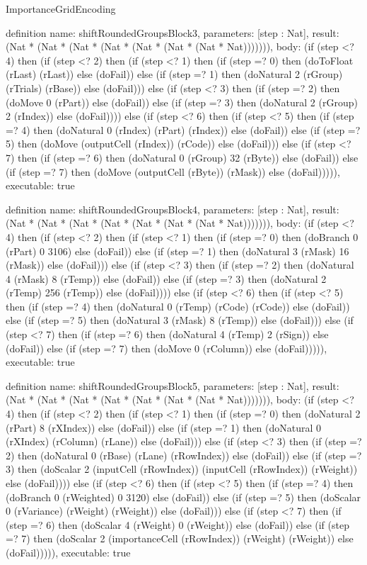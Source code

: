\begin{lexlean}{ImportanceGridEncoding}
\begin{semanticmodule}
definition{
  name: shiftRoundedGroupsBlock3,
  parameters: [step : Nat],
  result: (Nat * (Nat * (Nat * (Nat * (Nat * (Nat * (Nat * Nat))))))),
  body: (if (step <? 4) then
      (if (step <? 2) then
      (if (step <? 1) then
      (if (step =? 0) then (doToFloat (rLast) (rLast)) else (doFail)) else
      (if (step =? 1) then (doNatural 2 (rGroup) (rTrials) (rBase)) else (doFail))) else
      (if (step <? 3) then
      (if (step =? 2) then (doMove 0 (rPart)) else (doFail)) else
      (if (step =? 3) then (doNatural 2 (rGroup) 2 (rIndex)) else (doFail)))) else
      (if (step <? 6) then
      (if (step <? 5) then
      (if (step =? 4) then (doNatural 0 (rIndex) (rPart) (rIndex)) else (doFail)) else
      (if (step =? 5) then (doMove (outputCell (rIndex)) (rCode)) else (doFail))) else
      (if (step <? 7) then
      (if (step =? 6) then (doNatural 0 (rGroup) 32 (rByte)) else (doFail)) else
      (if (step =? 7) then (doMove (outputCell (rByte)) (rMask)) else (doFail))))),
  executable: true
}

definition{
  name: shiftRoundedGroupsBlock4,
  parameters: [step : Nat],
  result: (Nat * (Nat * (Nat * (Nat * (Nat * (Nat * (Nat * Nat))))))),
  body: (if (step <? 4) then
      (if (step <? 2) then
      (if (step <? 1) then
      (if (step =? 0) then (doBranch 0 (rPart) 0 3106) else (doFail)) else
      (if (step =? 1) then (doNatural 3 (rMask) 16 (rMask)) else (doFail))) else
      (if (step <? 3) then
      (if (step =? 2) then (doNatural 4 (rMask) 8 (rTemp)) else (doFail)) else
      (if (step =? 3) then (doNatural 2 (rTemp) 256 (rTemp)) else (doFail)))) else
      (if (step <? 6) then
      (if (step <? 5) then
      (if (step =? 4) then (doNatural 0 (rTemp) (rCode) (rCode)) else (doFail)) else
      (if (step =? 5) then (doNatural 3 (rMask) 8 (rTemp)) else (doFail))) else
      (if (step <? 7) then
      (if (step =? 6) then (doNatural 4 (rTemp) 2 (rSign)) else (doFail)) else
      (if (step =? 7) then (doMove 0 (rColumn)) else (doFail))))),
  executable: true
}

definition{
  name: shiftRoundedGroupsBlock5,
  parameters: [step : Nat],
  result: (Nat * (Nat * (Nat * (Nat * (Nat * (Nat * (Nat * Nat))))))),
  body: (if (step <? 4) then
      (if (step <? 2) then
      (if (step <? 1) then
      (if (step =? 0) then (doNatural 2 (rPart) 8 (rXIndex)) else (doFail)) else
      (if (step =? 1) then (doNatural 0 (rXIndex) (rColumn) (rLane)) else (doFail))) else
      (if (step <? 3) then
      (if (step =? 2) then (doNatural 0 (rBase) (rLane) (rRowIndex)) else (doFail)) else
      (if (step =? 3) then (doScalar 2 (inputCell (rRowIndex)) (inputCell (rRowIndex)) (rWeight)) else (doFail)))) else
      (if (step <? 6) then
      (if (step <? 5) then
      (if (step =? 4) then (doBranch 0 (rWeighted) 0 3120) else (doFail)) else
      (if (step =? 5) then (doScalar 0 (rVariance) (rWeight) (rWeight)) else (doFail))) else
      (if (step <? 7) then
      (if (step =? 6) then (doScalar 4 (rWeight) 0 (rWeight)) else (doFail)) else
      (if (step =? 7) then (doScalar 2 (importanceCell (rRowIndex)) (rWeight) (rWeight)) else (doFail))))),
  executable: true
}


\end{semanticmodule}
\end{lexlean}
